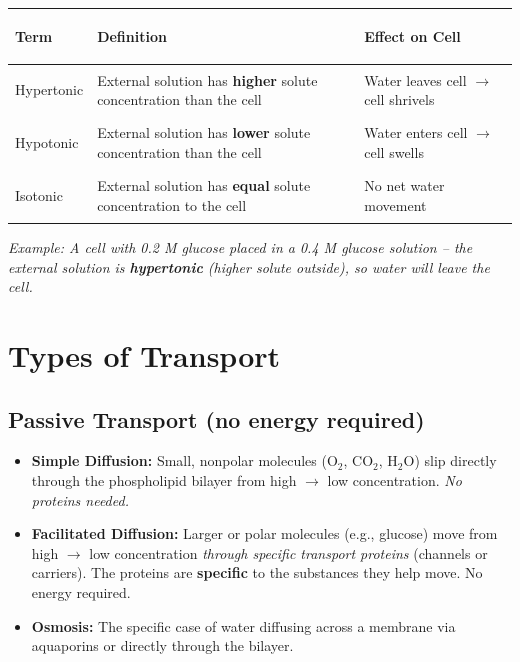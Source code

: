 \documentclass[11pt, letterpaper]{article}
\begin{document}
\noindent
{\renewcommand{\arraystretch}{1.5}
\begin{tabularx}{\textwidth}{>{\bfseries\raggedright\arraybackslash}p{3cm}>{\raggedright\arraybackslash}X>{\raggedright\arraybackslash}p{3.5cm}}
\toprule
\rowcolor{tableheaderteal}
\textbf{Term} & \textbf{Definition} & \textbf{Effect on Cell} \\
\midrule
\rowcolor{rowTe}
Hypertonic
  & External solution has \textbf{higher} solute concentration than the cell
  & Water leaves cell $\to$ cell shrivels \\
\rowcolor{rowA}
Hypotonic
  & External solution has \textbf{lower} solute concentration than the cell
  & Water enters cell $\to$ cell swells \\
\rowcolor{rowTe}
Isotonic
  & External solution has \textbf{equal} solute concentration to the cell
  & No net water movement \\
\bottomrule
\end{tabularx}}

\vspace{4pt}
\textit{Example: A cell with 0.2 M glucose placed in a 0.4 M glucose solution -- the external solution is \textbf{hypertonic} (higher solute outside), so water will leave the cell.}

\section*{Types of Transport}

\subsection*{Passive Transport (no energy required)}
\begin{itemize}[noitemsep]
  \item \textbf{Simple Diffusion:} Small, nonpolar molecules (O$_2$, CO$_2$, H$_2$O) slip directly through the phospholipid bilayer from high $\to$ low concentration. \textit{No proteins needed.}
  \item \textbf{Facilitated Diffusion:} Larger or polar molecules (e.g., glucose) move from high $\to$ low concentration \emph{through specific transport proteins} (channels or carriers). The proteins are \textbf{specific} to the substances they help move. No energy required.
  \item \textbf{Osmosis:} The specific case of water diffusing across a membrane via aquaporins or directly through the bilayer.
\end{itemize}
\end{document}
